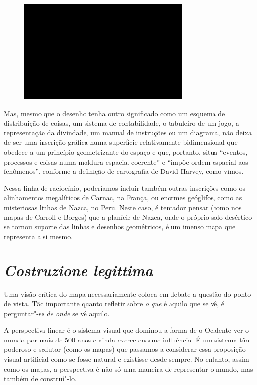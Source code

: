 \begin{figure}[!ht]
\centering
 \includegraphics[width=85mm]{./imgs/im1.jpg}
\caption{\tiny{}}
\end{figure}

Mas, mesmo que o desenho tenha outro significado como um esquema de
distribuição de coisas, um sistema de contabilidade, o tabuleiro de um
jogo, a representação da divindade, um manual de instruções ou um
diagrama, não deixa de ser uma inscrição gráfica numa superfície
relativamente bidimensional que obedece a um princípio geometrizante do
espaço e que, portanto, situa ``eventos, processos e coisas numa moldura
espacial coerente'' e ``impõe ordem espacial aos fenômenos'', conforme a
definição de cartografia de David Harvey, como vimos.

Nessa linha de raciocínio, poderíamos incluir também outras inscrições
como os alinhamentos megalíticos de Carnac, na França, ou enormes
geóglifos, como as misteriosas linhas de Nazca, no Peru. Neste caso, é
tentador pensar (como nos mapas de Carroll e Borges) que a planície de
Nazca, onde o próprio solo desértico se tornou suporte das linhas e
desenhos geométricos, é um imenso mapa que representa a si mesmo.

\chapter{\emph{Costruzione legittima}}

Uma visão crítica do mapa necessariamente coloca em debate a questão do
ponto de vista. Tão importante quanto refletir sobre \emph{o que} é
aquilo que se vê, é perguntar"-se \emph{de onde} se vê aquilo.

A perspectiva linear é o sistema visual que dominou a forma de o
Ocidente ver o mundo por mais de 500 anos e ainda exerce enorme
influência. É um sistema tão poderoso e sedutor (como os mapas) que
passamos a considerar essa proposição visual artificial como se fosse
natural e existisse desde sempre. No entanto, assim como os mapas, a
perspectiva é não só uma maneira de representar o mundo, mas também de
construí"-lo.

